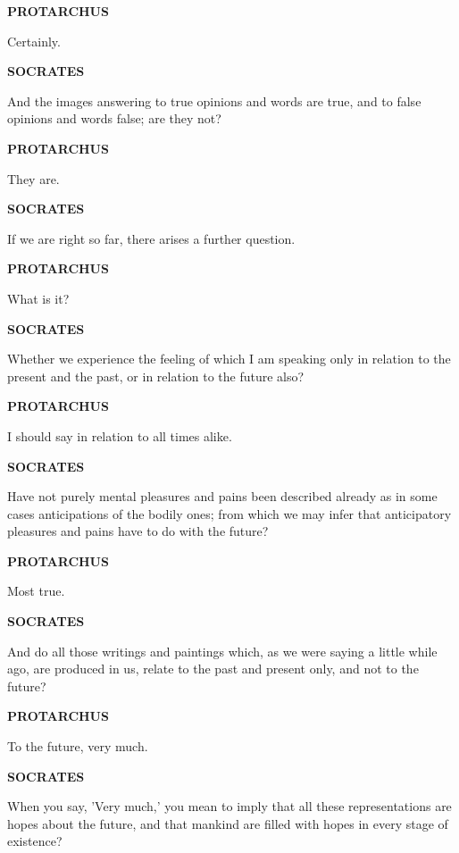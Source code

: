 \documentclass[11pt,letter]{article}
\begin{document}
\par \textbf{PROTARCHUS}
\par   Certainly.

\par \textbf{SOCRATES}
\par   And the images answering to true opinions and words are true, and to false opinions and words false; are they not?

\par \textbf{PROTARCHUS}
\par   They are.

\par \textbf{SOCRATES}
\par   If we are right so far, there arises a further question.

\par \textbf{PROTARCHUS}
\par   What is it?

\par \textbf{SOCRATES}
\par   Whether we experience the feeling of which I am speaking only in relation to the present and the past, or in relation to the future also?

\par \textbf{PROTARCHUS}
\par   I should say in relation to all times alike.

\par \textbf{SOCRATES}
\par   Have not purely mental pleasures and pains been described already as in some cases anticipations of the bodily ones; from which we may infer that anticipatory pleasures and pains have to do with the future?

\par \textbf{PROTARCHUS}
\par   Most true.

\par \textbf{SOCRATES}
\par   And do all those writings and paintings which, as we were saying a little while ago, are produced in us, relate to the past and present only, and not to the future?

\par \textbf{PROTARCHUS}
\par   To the future, very much.

\par \textbf{SOCRATES}
\par   When you say, 'Very much,' you mean to imply that all these representations are hopes about the future, and that mankind are filled with hopes in every stage of existence?
\end{document}
